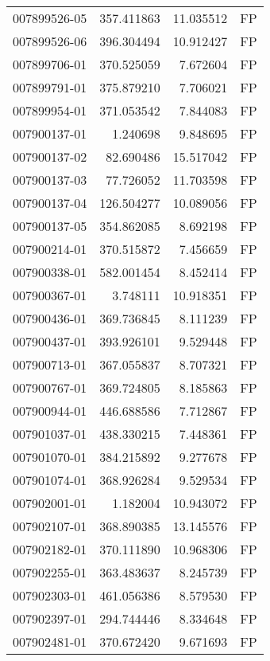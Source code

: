 \begin{tabular}{lrrl}
007899526-05 &  357.411863 &      11.035512 &   FP \\
007899526-06 &  396.304494 &      10.912427 &   FP \\
007899706-01 &  370.525059 &       7.672604 &   FP \\
007899791-01 &  375.879210 &       7.706021 &   FP \\
007899954-01 &  371.053542 &       7.844083 &   FP \\
007900137-01 &    1.240698 &       9.848695 &   FP \\
007900137-02 &   82.690486 &      15.517042 &   FP \\
007900137-03 &   77.726052 &      11.703598 &   FP \\
007900137-04 &  126.504277 &      10.089056 &   FP \\
007900137-05 &  354.862085 &       8.692198 &   FP \\
007900214-01 &  370.515872 &       7.456659 &   FP \\
007900338-01 &  582.001454 &       8.452414 &   FP \\
007900367-01 &    3.748111 &      10.918351 &   FP \\
007900436-01 &  369.736845 &       8.111239 &   FP \\
007900437-01 &  393.926101 &       9.529448 &   FP \\
007900713-01 &  367.055837 &       8.707321 &   FP \\
007900767-01 &  369.724805 &       8.185863 &   FP \\
007900944-01 &  446.688586 &       7.712867 &   FP \\
007901037-01 &  438.330215 &       7.448361 &   FP \\
007901070-01 &  384.215892 &       9.277678 &   FP \\
007901074-01 &  368.926284 &       9.529534 &   FP \\
007902001-01 &    1.182004 &      10.943072 &   FP \\
007902107-01 &  368.890385 &      13.145576 &   FP \\
007902182-01 &  370.111890 &      10.968306 &   FP \\
007902255-01 &  363.483637 &       8.245739 &   FP \\
007902303-01 &  461.056386 &       8.579530 &   FP \\
007902397-01 &  294.744446 &       8.334648 &   FP \\
007902481-01 &  370.672420 &       9.671693 &   FP \\

\end{tabular}
